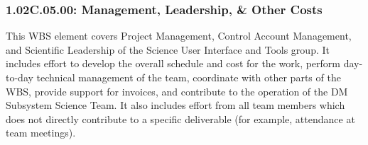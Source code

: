 \subsubsection*{1.02C.05.00: Management, Leadership, \& Other Costs}

This WBS element covers Project Management, Control Account Management, and
Scientific Leadership of the Science User Interface and Tools group. It
includes effort to develop the overall schedule and cost for the work, perform
day-to-day technical management of the team, coordinate with other parts of
the WBS, provide support for invoices, and contribute to the operation of the DM
Subsystem Science Team. It also includes effort from all team members which
does not directly contribute to a specific deliverable (for example,
attendance at team meetings).
